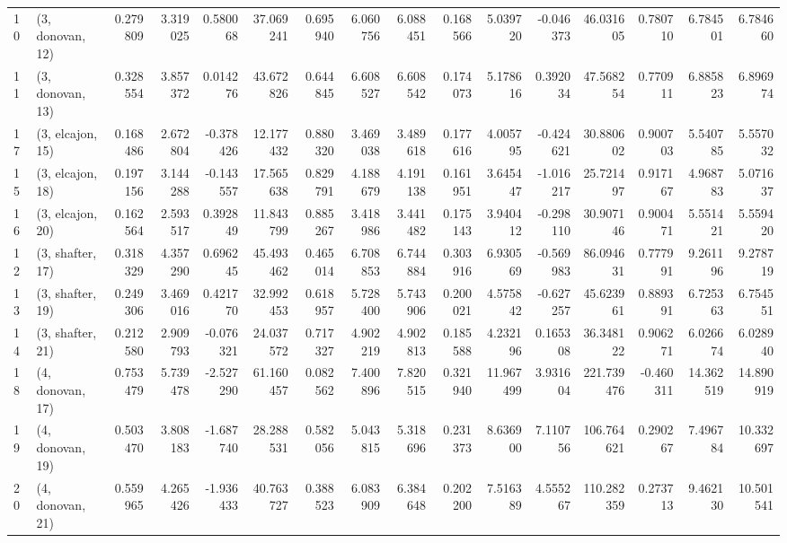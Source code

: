 \begin{tabular}{llrrrrrrrrrrrrrr}
10 &  (3, donovan, 12) &   0.279809 &  3.319025 &  0.580068 &  37.069241 &  0.695940 &   6.060756 &  6.088451 &  0.168566 &   5.039720 & -0.046373 &   46.031605 &  0.780710 &   6.784501 &   6.784660 \\
11 &  (3, donovan, 13) &   0.328554 &  3.857372 &  0.014276 &  43.672826 &  0.644845 &   6.608527 &  6.608542 &  0.174073 &   5.178616 &  0.392034 &   47.568254 &  0.770911 &   6.885823 &   6.896974 \\
17 &  (3, elcajon, 15) &   0.168486 &  2.672804 & -0.378426 &  12.177432 &  0.880320 &   3.469038 &  3.489618 &  0.177616 &   4.005795 & -0.424621 &   30.880602 &  0.900703 &   5.540785 &   5.557032 \\
15 &  (3, elcajon, 18) &   0.197156 &  3.144288 & -0.143557 &  17.565638 &  0.829791 &   4.188679 &  4.191138 &  0.161951 &   3.645447 & -1.016217 &   25.721497 &  0.917167 &   4.968783 &   5.071637 \\
16 &  (3, elcajon, 20) &   0.162564 &  2.593517 &  0.392849 &  11.843799 &  0.885267 &   3.418986 &  3.441482 &  0.175143 &   3.940412 & -0.298110 &   30.907146 &  0.900471 &   5.551421 &   5.559420 \\
12 &  (3, shafter, 17) &   0.318329 &  4.357290 &  0.696245 &  45.493462 &  0.465014 &   6.708853 &  6.744884 &  0.303916 &   6.930569 & -0.569983 &   86.094631 &  0.777991 &   9.261196 &   9.278719 \\
13 &  (3, shafter, 19) &   0.249306 &  3.469016 &  0.421770 &  32.992453 &  0.618957 &   5.728400 &  5.743906 &  0.200021 &   4.575842 & -0.627257 &   45.623961 &  0.889391 &   6.725363 &   6.754551 \\
14 &  (3, shafter, 21) &   0.212580 &  2.909793 & -0.076321 &  24.037572 &  0.717327 &   4.902219 &  4.902813 &  0.185588 &   4.232196 &  0.165308 &   36.348122 &  0.906271 &   6.026674 &   6.028940 \\
18 &  (4, donovan, 17) &   0.753479 &  5.739478 & -2.527290 &  61.160457 &  0.082562 &   7.400896 &  7.820515 &  0.321940 &  11.967499 &  3.931604 &  221.739476 & -0.460311 &  14.362519 &  14.890919 \\
19 &  (4, donovan, 19) &   0.503470 &  3.808183 & -1.687740 &  28.288531 &  0.582056 &   5.043815 &  5.318696 &  0.231373 &   8.636900 &  7.110756 &  106.764621 &  0.290267 &   7.496784 &  10.332697 \\
20 &  (4, donovan, 21) &   0.559965 &  4.265426 & -1.936433 &  40.763727 &  0.388523 &   6.083909 &  6.384648 &  0.202200 &   7.516389 &  4.555267 &  110.282359 &  0.273713 &   9.462130 &  10.501541 \\

\end{tabular}
